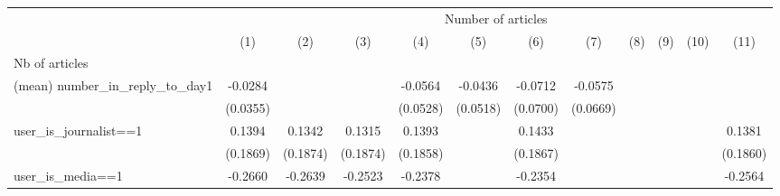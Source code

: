 {
\def\sym#1{\ifmmode^{#1}\else\(^{#1}\)\fi}
\begin{tabular}{l*{11}{c}}
\hline\hline
                    &\multicolumn{11}{c}{Number of articles}                                                                                                                                                                                                          \\\cmidrule(lr){2-12}
                    &\multicolumn{1}{c}{(1)}         &\multicolumn{1}{c}{(2)}         &\multicolumn{1}{c}{(3)}         &\multicolumn{1}{c}{(4)}         &\multicolumn{1}{c}{(5)}         &\multicolumn{1}{c}{(6)}         &\multicolumn{1}{c}{(7)}         &\multicolumn{1}{c}{(8)}         &\multicolumn{1}{c}{(9)}         &\multicolumn{1}{c}{(10)}         &\multicolumn{1}{c}{(11)}         \\
\hline
Nb of articles      &                     &                     &                     &                     &                     &                     &                     &                     &                     &                     &                     \\
(mean) number\_in\_reply\_to\_day1&     -0.0284         &                     &                     &     -0.0564         &     -0.0436         &     -0.0712         &     -0.0575         &                     &                     &                     &                     \\
                    &    (0.0355)         &                     &                     &    (0.0528)         &    (0.0518)         &    (0.0700)         &    (0.0669)         &                     &                     &                     &                     \\
user\_is\_journalist==1&      0.1394         &      0.1342         &      0.1315         &      0.1393         &                     &      0.1433         &                     &                     &                     &                     &      0.1381         \\
                    &    (0.1869)         &    (0.1874)         &    (0.1874)         &    (0.1858)         &                     &    (0.1867)         &                     &                     &                     &                     &    (0.1860)         \\
user\_is\_media==1    &     -0.2660         &     -0.2639         &     -0.2523         &     -0.2378         &                     &     -0.2354         &                     &                     &                     &                     &     -0.2564         \\

\end{tabular}}
